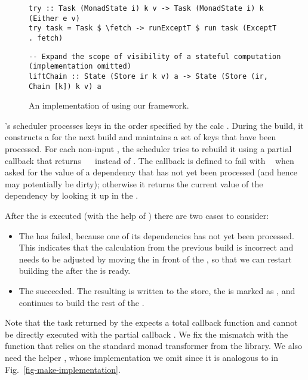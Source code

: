 \begin{figure}
\begin{verbatim}
try :: Task (MonadState i) k v -> Task (MonadState i) k (Either e v)
try task = Task $ \fetch -> runExceptT $ run task (ExceptT . fetch)
\end{verbatim}
\vspace{1mm}
\begin{verbatim}
-- Expand the scope of visibility of a stateful computation (implementation omitted)
liftChain :: State (Store ir k v) a -> State (Store (ir, Chain [k]) k v) a
\end{verbatim}
\vspace{-2.5mm}
\caption{An implementation of \Excel using our framework.}\label{fig-excel-implementation}
\vspace{-2.5mm}
\end{figure}

\Excel's  scheduler processes keys in the order specified by the
calc . During the build, it constructs a  for the next
build and maintains a set of keys  that have been processed. For each
non-input , the scheduler tries to rebuild it using a partial 
callback that returns ~~ instead of . The callback
is defined to fail with ~ when asked for the value of a
dependency  that has not yet been processed (and hence may potentially
be dirty); otherwise it returns the current value of the dependency by looking
it up in the .

After the  is executed (with the help of ) there are
two cases to consider:

\begin{itemize}
    \item The  has failed, because one of its dependencies 
    has not yet been processed. This indicates that the calculation 
    from the previous build is incorrect and needs to be adjusted by moving the
     in front of the , so that we can restart building the
     after the  is ready.
    \item The  succeeded. The resulting  is written to
    the store, the  is marked as , and \Excel continues to
    build the rest of the .
\end{itemize}

Note that the task returned by the  expects a total callback
function and cannot be directly executed with the partial callback .
We fix the mismatch with the function  that relies on the standard
monad transformer  from the  library. We also
need the helper , whose implementation we omit since it
is analogous to  in Fig.~\ref{fig-make-implementation}.

